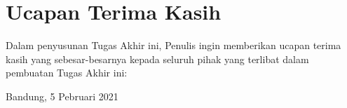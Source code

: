 \chapter*{Ucapan Terima Kasih}
Dalam penyusunan Tugas Akhir ini, Penulis ingin memberikan ucapan terima kasih yang sebesar-besarnya kepada seluruh pihak yang terlibat dalam pembuatan Tugas Akhir ini:

\vspace*{0.1cm}
\begin{flushright}
Bandung, 5 Pebruari 2021\\[0.1cm]
\vspace*{1cm}
\penulis

\end{flushright}